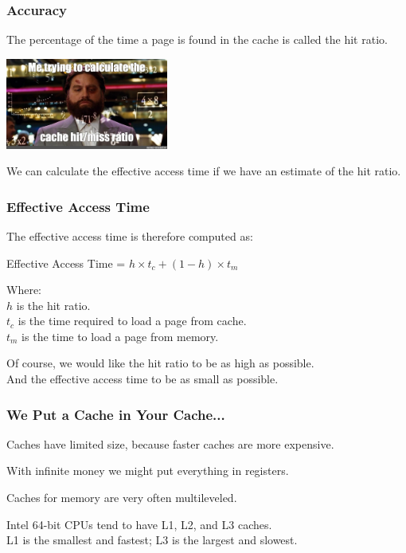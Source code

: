 \begin{frame}
\frametitle{Accuracy}

The percentage of the time  a page is found in the cache is called the \alert{hit ratio}.

\begin{center}
	\includegraphics[width=0.4\textwidth]{images/hitratio.jpg}
\end{center}

We can calculate the effective access time if we have an estimate of the hit ratio.

\end{frame}

\begin{frame}
\frametitle{Effective Access Time}

The effective access time is therefore computed as:

\begin{center}
Effective Access Time = $h \times t_{c} + (1-h) \times t_{m}$
\end{center}

Where:\\
\quad $h$ is the hit ratio.\\
\quad $t_{c}$ is the time required to load a page from cache.\\
\quad $t_{m}$ is the time to load a page from memory. 


Of course, we would like the hit ratio to be as high as possible.\\
\quad And the effective access time to be as small as possible.

\end{frame}

\begin{frame}
\frametitle{We Put a Cache in Your Cache...}

Caches have limited size, because faster caches are more expensive. 

With infinite money we might put everything in registers.

Caches for memory are very often multileveled. 

Intel 64-bit CPUs tend to have L1, L2, and L3 caches.\\
\quad L1 is the smallest and fastest;  L3 is the largest and slowest.

\end{frame}

